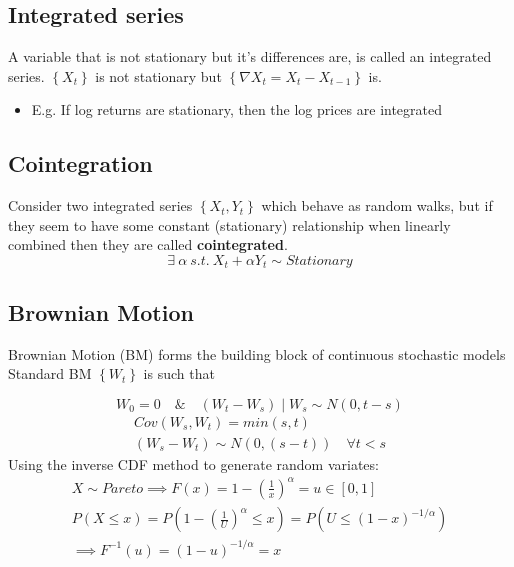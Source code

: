 \documentclass[
  oneside]{book}
\providecommand{\tightlist}{%
  \setlength{\itemsep}{0pt}\setlength{\parskip}{0pt}}
\begin{document}
\hypertarget{integrated-series-1}{%
\subsection{Integrated series}\label{integrated-series-1}}

A variable that is not stationary but it's differences are, is called an integrated series. \(\left\{ X_{t} \right\}\) is not stationary but \(\left\{ \nabla X_{t} = X_{t} - X_{t-1}\right\}\) is.

\begin{itemize}
\tightlist
\item
  E.g. If log returns are stationary, then the log prices are integrated
\end{itemize}

\hypertarget{cointegration-1}{%
\subsection{Cointegration}\label{cointegration-1}}

Consider two integrated series \(\left\{ X_{t}, Y_{t} \right\}\) which behave as random walks, but if they seem to have some constant (stationary) relationship when linearly combined then they are called \textbf{cointegrated}.
\[
\exists \ \alpha\ s.t.\ X_{t} + \alpha Y_{t} \sim Stationary
\]

\hypertarget{brownian-motion-1}{%
\subsection{Brownian Motion}\label{brownian-motion-1}}

Brownian Motion (BM) forms the building block of continuous stochastic models
Standard BM \(\left\{W_t\right\}\) is such that

\[
W_0=0 \quad \& \quad (W_t-W_s) \mid W_s \sim N(0, t-s)
\]
\[
\begin{gathered}
Cov(W_{s},W_{t}) = min(s,t)\\
(W_{s}-W_{t}) \sim N(0, (s-t)) \quad \forall t<s
\end{gathered}
\]
Using the inverse CDF method to generate random variates:
\[
\begin{gathered}
X \sim Pareto \implies F(x) = 1-\left( \frac{1}{x} \right)^{\alpha} = u \in [0,1]\\
P(X \leq x) = P(1-\left( \frac{1}{U} \right)^{\alpha} \leq x)=P(U \leq (1-x)^{-1/\alpha})\\
\implies F^{-1}(u) = (1-u)^{-1/\alpha} = x
\end{gathered}
\]
\end{document}
